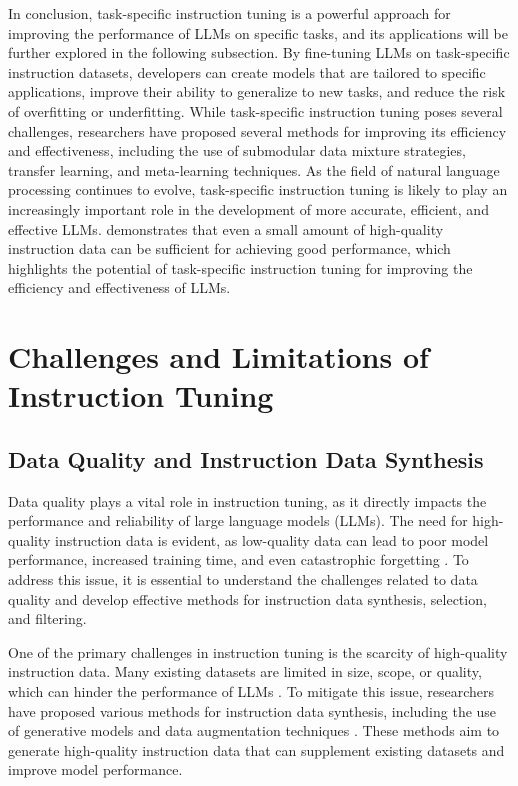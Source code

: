 \documentclass[11pt]{article}
\begin{document}
In conclusion, task-specific instruction tuning is a powerful approach for improving the performance of LLMs on specific tasks, and its applications will be further explored in the following subsection. By fine-tuning LLMs on task-specific instruction datasets, developers can create models that are tailored to specific applications, improve their ability to generalize to new tasks, and reduce the risk of overfitting or underfitting. While task-specific instruction tuning poses several challenges, researchers have proposed several methods for improving its efficiency and effectiveness, including the use of submodular data mixture strategies, transfer learning, and meta-learning techniques. As the field of natural language processing continues to evolve, task-specific instruction tuning is likely to play an increasingly important role in the development of more accurate, efficient, and effective LLMs. \cite{ref91} demonstrates that even a small amount of high-quality instruction data can be sufficient for achieving good performance, which highlights the potential of task-specific instruction tuning for improving the efficiency and effectiveness of LLMs.

\section{Challenges and Limitations of Instruction Tuning}

\subsection{Data Quality and Instruction Data Synthesis}

Data quality plays a vital role in instruction tuning, as it directly impacts the performance and reliability of large language models (LLMs). The need for high-quality instruction data is evident, as low-quality data can lead to poor model performance, increased training time, and even catastrophic forgetting \cite{ref13}. To address this issue, it is essential to understand the challenges related to data quality and develop effective methods for instruction data synthesis, selection, and filtering.

One of the primary challenges in instruction tuning is the scarcity of high-quality instruction data. Many existing datasets are limited in size, scope, or quality, which can hinder the performance of LLMs \cite{ref8}. To mitigate this issue, researchers have proposed various methods for instruction data synthesis, including the use of generative models \cite{ref92} and data augmentation techniques \cite{ref30}. These methods aim to generate high-quality instruction data that can supplement existing datasets and improve model performance.
\end{document}
